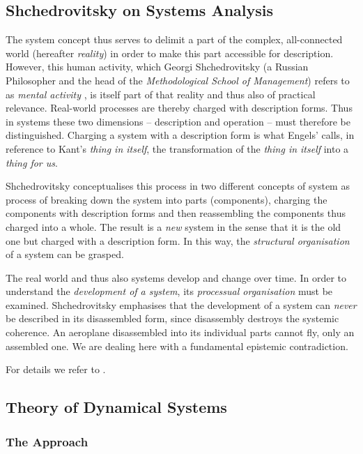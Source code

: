 \documentclass[11pt,a4paper]{article}
\begin{document}
\subsection{Shchedrovitsky on Systems Analysis}

The system concept thus serves to delimit a part of the complex, all-connected
world (hereafter \emph{reality}) in order to make this part accessible for
description. However, this human activity, which Georgi Shchedrovitsky (a
Russian Philosopher and the head of the \emph{Methodological School of
  Management}) refers to as \emph{mental activity} \cite[p. 47]{MSM}, is
itself part of that reality and thus also of practical relevance. Real-world
processes are thereby charged with description forms. Thus in systems these
two dimensions -- description and operation -- must therefore be
distinguished. Charging a system with a description form is what Engels'
calls, in reference to Kant's \emph{thing in itself}, the transformation of
the \emph{thing in itself} into a \emph{thing for us}.

Shchedrovitsky \cite[p. 80 ff.]{MSM} conceptualises this process in two
different concepts of system \cite[pp. 89 and 98]{MSM} as process of breaking
down the system into parts (components), charging the components with
description forms and then reassembling the components thus charged into a
whole.  The result is a \emph{new} system in the sense that it is the old one
but charged with a description form.  In this way, the \emph{structural
  organisation} of a system can be grasped.

The real world and thus also systems develop and change over time. In order to
understand the \emph{development of a system}, its \emph{processual
  organisation} must be examined.  Shchedrovitsky emphasises that the
development of a system can \emph{never} be described in its disassembled
form, since disassembly destroys the systemic coherence. An aeroplane
disassembled into its individual parts cannot fly, only an assembled one. We
are dealing here with a fundamental epistemic contradiction.

For details we refer to \cite{MSM}.

\subsection{Theory of Dynamical Systems}

\subsubsection{The Approach}
\end{document}
